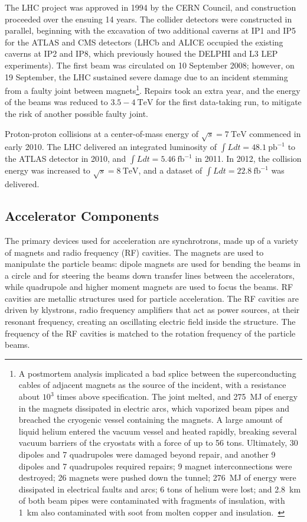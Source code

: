 The LHC project was approved in 1994 by the CERN Council, and construction proceeded over the ensuing 14 years. The collider detectors were constructed in parallel, beginning with the excavation of two additional caverns at IP1 and IP5 for the ATLAS and CMS detectors (LHCb and ALICE occupied the existing caverns at IP2 and IP8, which previously housed the DELPHI and L3 LEP experiments). The first beam was circulated on 10 September 2008; however, on 19 September, the LHC sustained severe damage due to an incident stemming from a faulty joint between magnets\footnote{A postmortem analysis implicated a bad splice between the superconducting cables of adjacent magnets as the source of the incident, with a resistance about $10^3$ times above specification. The joint melted, and 275~MJ of energy in the magnets dissipated in electric arcs, which vaporized beam pipes and breached the cryogenic vessel containing the magnets. A large amount of liquid helium entered the vacuum vessel and heated rapidly, breaking several vacuum barriers of the cryostats with a force of up to 56 tons. Ultimately, 30 dipoles and 7 quadrupoles were damaged beyond repair, and another 9 dipoles and 7 quadrupoles required repairs; 9 magnet interconnections were destroyed; 26 magnets were pushed down the tunnel; 276~MJ of energy were dissipated in electrical faults and arcs; 6 tons of helium were lost; and 2.8~km of both beam pipes were contaminated with fragments of insulation, with 1~km also contaminated with soot from molten copper and insulation.~\cite{Rossi:2010el}}. Repairs took an extra year, and the energy of the beams was reduced to $3.5-4~\mbox{TeV}$ for the first data-taking run, to mitigate the risk of another possible faulty joint. 

Proton-proton collisions at a center-of-mass energy of $\sqrt{s}=7~\mbox{TeV}$ commenced in early 2010. The LHC delivered an integrated luminosity of $\int L dt=48.1~\mbox{pb}^{-1}$ to the ATLAS detector in 2010, and $\int L dt=5.46~\mbox{fb}^{-1}$ in 2011. In 2012, the collision energy was increased to $\sqrt{s}=8~\mbox{TeV}$, and a dataset of $\int L dt=22.8~\mbox{fb}^{-1}$ was delivered. 

\subsection{Accelerator Components}
The primary devices used for acceleration are synchrotrons, made up of a variety of magnets and radio frequency (RF) cavities. The magnets are used to manipulate the particle beams: dipole magnets are used for bending the beams in a circle and for steering the beams down transfer lines between the accelerators, while quadrupole and higher moment magnets are used to focus the beams. RF cavities are metallic structures used for particle acceleration. The RF cavities are driven by klystrons, radio frequency amplifiers that act as power sources, at their resonant frequency, creating an oscillating electric field inside the structure. The frequency of the RF cavities is matched to the rotation frequency of the particle beams.

